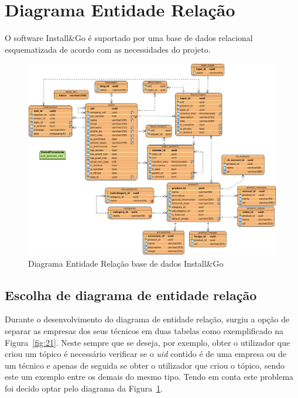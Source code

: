 \section{Diagrama Entidade Relação}

O software Install\&Go é suportado por uma base de dados relacional esquematizada de acordo com as necessidades do projeto.

\begin{figure}[htb]
    \centering
    
    \includegraphics[width=\textwidth]{images/diagramas/diagrama_bd.png}
    \caption{Diagrama Entidade Relação base de dados Install\&Go}
    \label{fig:20}
\end{figure}

\newpage

\subsection{Escolha de diagrama de entidade relação}
Durante o desenvolvimento do diagrama de entidade relação, surgiu 
a opção de separar as empresas dos seus técnicos em duas tabelas como 
exemplificado na Figura~\ref{fig:21}. Neste sempre que se
deseja, por exemplo, obter o utilizador que criou um tópico é necessário
verificar se o \textit{uid} contido é de uma empresa ou de um técnico e apenas de seguida se obter o utilizador que criou o tópico, sendo este um exemplo entre os demais do mesmo tipo. Tendo em conta este problema foi decido optar pelo diagrama da Figura~\ref{fig:20}.

